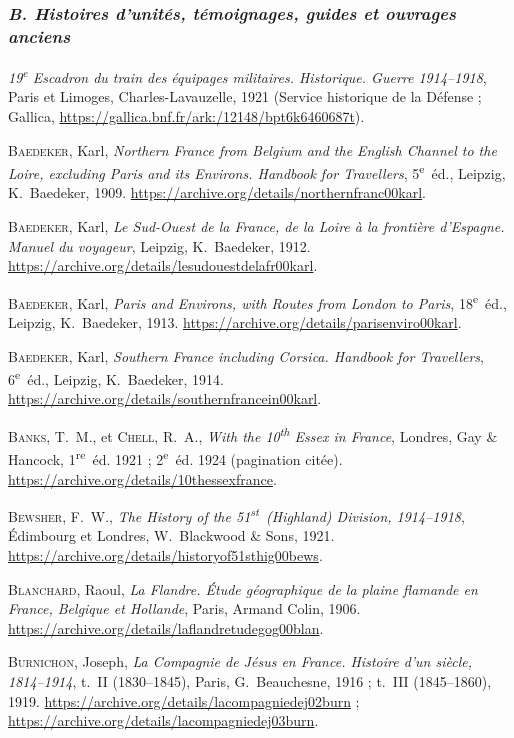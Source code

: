 \subsubsection*{\normalsize\mdseries\itshape B. Histoires d'unités, témoignages, guides et ouvrages anciens}

\begin{biblist}
\item \textit{19\textsuperscript{e} Escadron du train des équipages militaires. Historique. Guerre 1914--1918}, Paris et Limoges, Charles-Lavauzelle, 1921 (Service historique de la Défense ; Gallica, \url{https://gallica.bnf.fr/ark:/12148/bpt6k6460687t}).
\item \textsc{Baedeker}, Karl, \textit{Northern France from Belgium and the English Channel to the Loire, excluding Paris and its Environs. Handbook for Travellers}, 5\textsuperscript{e}~éd., Leipzig, K.~Baedeker, 1909. \url{https://archive.org/details/northernfranc00karl}.
\item \textsc{Baedeker}, Karl, \textit{Le Sud-Ouest de la France, de la Loire à la frontière d'Espagne. Manuel du voyageur}, Leipzig, K.~Baedeker, 1912. \url{https://archive.org/details/lesudouestdelafr00karl}.
\item \textsc{Baedeker}, Karl, \textit{Paris and Environs, with Routes from London to Paris}, 18\textsuperscript{e}~éd., Leipzig, K.~Baedeker, 1913. \url{https://archive.org/details/parisenviro00karl}.
\item \textsc{Baedeker}, Karl, \textit{Southern France including Corsica. Handbook for Travellers}, 6\textsuperscript{e}~éd., Leipzig, K.~Baedeker, 1914. \url{https://archive.org/details/southernfrancein00karl}.
\item \textsc{Banks}, T.~M., et \textsc{Chell}, R.~A., \textit{With the 10\textsuperscript{th} Essex in France}, Londres, Gay \& Hancock, 1\textsuperscript{re}~éd. 1921 ; 2\textsuperscript{e}~éd. 1924 (pagination citée). \url{https://archive.org/details/10thessexfrance}.
\item \textsc{Bewsher}, F.~W., \textit{The History of the 51\textsuperscript{st}~(Highland) Division, 1914--1918}, Édimbourg et Londres, W.~Blackwood \& Sons, 1921. \url{https://archive.org/details/historyof51sthig00bews}.
\item \textsc{Blanchard}, Raoul, \textit{La Flandre. Étude géographique de la plaine flamande en France, Belgique et Hollande}, Paris, Armand Colin, 1906. \url{https://archive.org/details/laflandretudegog00blan}.
\item \textsc{Burnichon}, Joseph, \textit{La Compagnie de Jésus en France. Histoire d'un siècle, 1814--1914}, t.~II (1830--1845), Paris, G.~Beauchesne, 1916 ; t.~III (1845--1860), 1919. \url{https://archive.org/details/lacompagniedej02burn} ; \url{https://archive.org/details/lacompagniedej03burn}.

\end{biblist}
